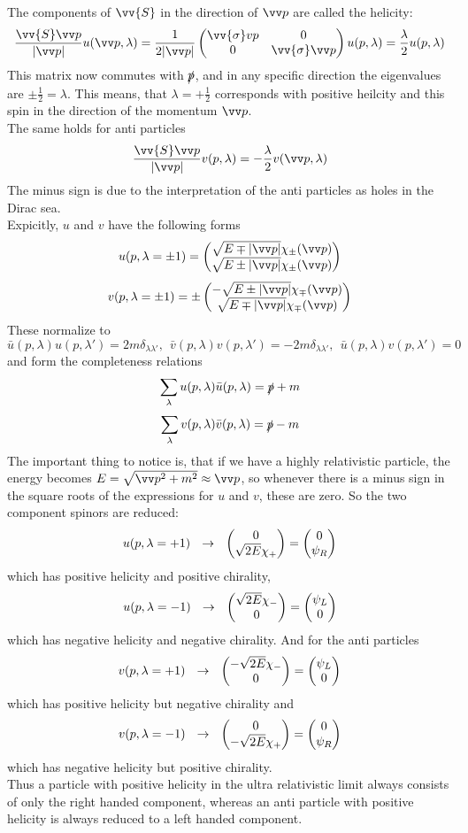 The components of $\vv{S}$ in the direction of $\vp$ are called the helicity:
\[\frac{\vv{S}\vp}{|\vp|} u(\vp, \lambda) = \frac{1}{2|\vp|}\Matz{\vv{\sigma}vp}{0}{0}{\vv{\sigma}\vp}u(p,\lambda) = \frac{\lambda}{2}u(p,\lambda)\]
This matrix now commutes with $\slashed{p}$, and in any specific direction the eigenvalues are $\pm \frac{1}{2} = \lambda$. This means, that $\lambda = + \frac{1}{2}$ corresponds with positive heilcity and this spin in the direction of the momentum $\vp$.\\
The same holds for anti particles
\[ \frac{ \vv{S}\vp }{ |\vp| } v(p,\lambda) = - \frac{\lambda}{2}v(\vp, \lambda)\]
The minus sign is due to the interpretation of the anti particles as holes in the Dirac sea.\\
Expicitly, $u$ and $v$ have the following forms
\[ u(p, \lambda = \pm 1) = \vektorz{ \sqrt{ E\mp |\vp|} \chi_\pm(\vp)}{\sqrt{E\pm|\vp|} \chi_\pm(\vp)}\]
\[ v(p, \lambda = \pm 1) = \pm\vektorz{-\sqrt{E\pm|\vp|} \chi_\mp(\vp)}{\sqrt{E\mp |\vp|}\chi_\mp(\vp)}\]
These normalize to
\[ \bar{u}(p, \lambda) u(p, \lambda') = 2m \delta_{\lambda\lambda'}, ~~\bar{v}(p, \lambda)v(p, \lambda') = - 2m \delta_{\lambda\lambda'}, ~~ \bar{u}(p, \lambda)v(p,\lambda') = 0\]
and form the completeness relations
\[ \sum_\lambda u(p,\lambda) \bar{u}(p,\lambda) = \slashed{p} + m\]
\[ \sum_\lambda v(p, \lambda) \bar{v}(p,\lambda) = \slashed{p} - m\]
The important thing to notice is, that if we have a highly relativistic particle, the energy becomes $E = \sqrt{\vp^2 + m^2} \approx \vp$, so whenever there is a minus sign in the square roots of the expressions for $u$ and $v$, these are zero. So the two component spinors are reduced:
\[ u(p, \lambda = +1) ~~\rightarrow~~ \begin{pmatrix} 0 \\ \sqrt{2E} \chi_+ \end{pmatrix} = \begin{pmatrix} 0 \\ \psi_R \end{pmatrix}\]
which has positive helicity and positive chirality,
\[ u(p, \lambda = -1) ~~\rightarrow~~ \begin{pmatrix} \sqrt{2E} \chi_- \\ 0 \end{pmatrix} = \begin{pmatrix} \psi_L \\ 0 \end{pmatrix}\]
which has negative helicity and negative chirality. And for the anti particles
\[v(p, \lambda = +1) ~~\rightarrow~~\begin{pmatrix} -\sqrt{2E}\chi_- \\ 0 \end{pmatrix} = \begin{pmatrix} \psi_L \\ 0 \end{pmatrix}\]
which has positive helicity but negative chirality and
\[v(p, \lambda = -1) ~~\rightarrow~~\begin{pmatrix} 0 \\ - \sqrt{2E} \chi_+ \end{pmatrix} = \begin{pmatrix} 0 \\ \psi_R \end{pmatrix}\]
which has negative helicity but positive chirality.\\
Thus a particle with positive helicity in the ultra relativistic limit always consists of only the right handed component, whereas an anti particle with positive helicity is always reduced to a left handed component.

